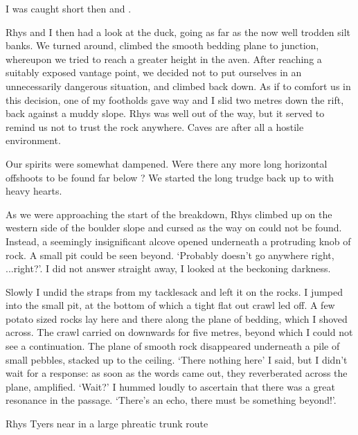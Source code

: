 I was caught short then and . 

Rhys and I then had a look at the duck, going as far as the now well trodden silt banks. We turned around, climbed the smooth bedding plane to  junction, whereupon we tried to reach a greater height in the aven. After reaching a suitably exposed vantage point, we decided not to put ourselves in an unnecessarily dangerous situation, and climbed back down. As if to comfort us in this decision, one of my footholds gave way and I slid two metres down the rift, back against a muddy slope. Rhys was well out of the way, but it served to remind us not to trust the rock anywhere. Caves are after all a hostile environment. 

Our spirits were somewhat dampened. Were there any more long horizontal offshoots to be found far below ? We started the long trudge back up to  with heavy hearts.

As we were approaching the start of the  breakdown, Rhys climbed up on the western side of the boulder slope and cursed as the way on could not be found. Instead, a seemingly insignificant alcove opened underneath a protruding knob of rock. A small pit could be seen beyond. `Probably doesn't go anywhere right, ...right?'. I did not answer straight away, I looked at the beckoning darkness.

Slowly I undid the straps from my tacklesack and left it on the rocks. I jumped into the small  pit, at the bottom of which a tight flat out crawl led off. A few potato sized rocks lay here and there along the plane of bedding, which I shoved across. The crawl carried on downwards for five metres, beyond which I could not see a continuation. The plane of smooth rock disappeared underneath a pile of small pebbles, stacked up to the ceiling. `There nothing here' I said, but I didn't wait for a response: as soon as the words came out, they reverberated across the plane, amplified. `Wait?' I hummed loudly to ascertain that there was a great resonance in the passage. `There's an echo, there must be something beyond!'.
\begin{marginfigure}
	\checkoddpage \ifoddpage \forcerectofloat \else \forceversofloat \fi
	\centering
	\caption{Rhys Tyers near  in a large phreatic trunk route }
	\label{near duck}
\end{marginfigure}


